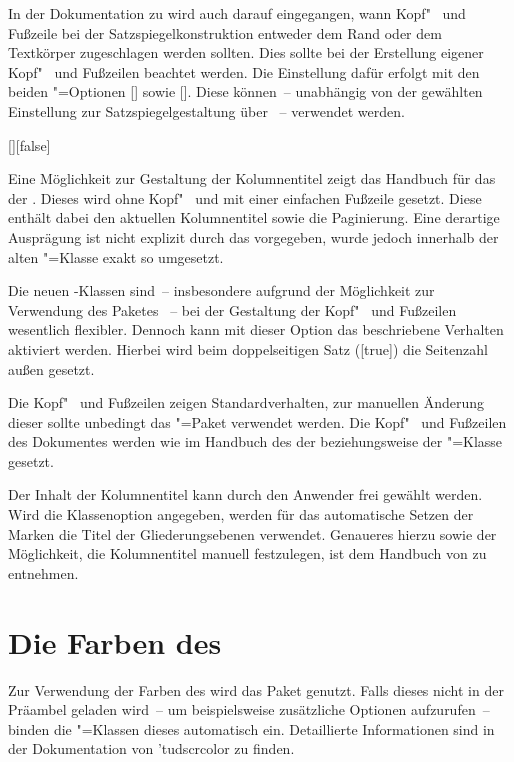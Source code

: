 In der Dokumentation zu  wird auch darauf eingegangen, wann 
Kopf"~ und Fußzeile bei der Satzspiegelkonstruktion entweder dem Rand oder dem 
Textkörper zugeschlagen werden sollten. Dies sollte bei der Erstellung eigener 
Kopf"~ und Fußzeilen beachtet werden. Die Einstellung dafür erfolgt mit den 
beiden \KOMAScript"=Optionen [\PBoolean] sowie 
[\PBoolean]. Diese können~-- unabhängig von der gewählten 
Einstellung zur Satzspiegelgestaltung über ~-- verwendet 
werden.

\begin{Declaration}{[\PBoolean]}[false]%
\printdeclarationlist%
%

Eine Möglichkeit zur Gestaltung der Kolumnentitel zeigt das Handbuch für das 
\CD der \TnUD. Dieses wird ohne Kopf"~ und mit einer einfachen Fußzeile 
gesetzt. Diese enthält dabei den aktuellen Kolumnentitel sowie die Paginierung. 
Eine derartige Ausprägung ist nicht explizit durch das \CD vorgegeben, wurde 
jedoch innerhalb der alten "=Klasse exakt so umgesetzt.

Die neuen \TUDScript-Klassen sind~-- insbesondere aufgrund der Möglichkeit zur 
Verwendung des Paketes ~-- bei der Gestaltung der 
Kopf"~ und Fußzeilen wesentlich flexibler. Dennoch kann mit dieser Option das 
beschriebene Verhalten aktiviert werden. Hierbei wird beim doppelseitigen Satz 
([true]) die Seitenzahl außen gesetzt.
%
\begin{values}
\itemfalse
  Die Kopf"~ und Fußzeilen zeigen Standardverhalten, zur manuellen Änderung 
  dieser sollte unbedingt das \KOMAScript"=Paket  
  verwendet werden.
\itemtrue*
  Die Kopf"~ und Fußzeilen des Dokumentes werden wie im Handbuch des \CDs der 
  \TnUD beziehungsweise der "=Klasse gesetzt.
\end{values}
%
Der Inhalt der Kolumnentitel kann durch den Anwender frei gewählt werden. Wird 
die Klassenoption  angegeben, werden für das automatische 
Setzen der Marken die Titel der Gliederungsebenen verwendet. Genaueres hierzu 
sowie der Möglichkeit, die Kolumnentitel manuell festzulegen, ist dem Handbuch 
von \KOMAScript{} zu entnehmen.
\end{Declaration}



\section{Die Farben des \CDs}
Zur Verwendung der Farben des \CDs wird das Paket  
genutzt. Falls dieses nicht in der Präambel geladen wird~-- um beispielsweise 
zusätzliche Optionen aufzurufen~-- binden die \TUDScript"=Klassen dieses 
automatisch ein. Detaillierte Informationen sind in der Dokumentation von 
\Package*'{tudscrcolor} zu finden.



